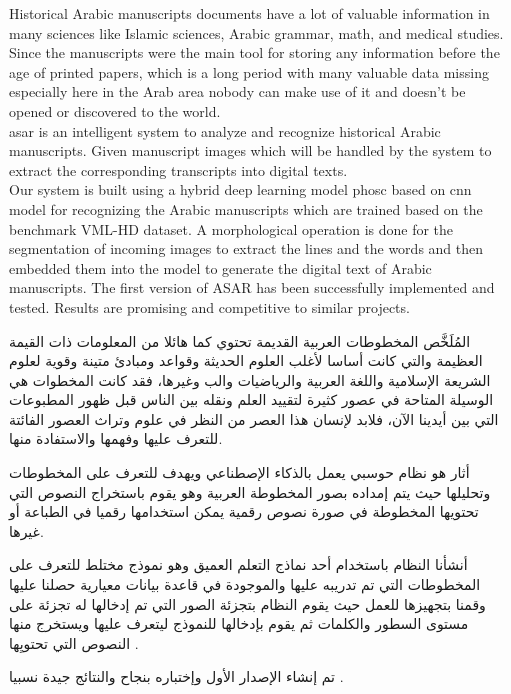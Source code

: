 Historical Arabic manuscripts documents have a lot of valuable information in many sciences like Islamic sciences, Arabic grammar, math, and medical studies. Since the manuscripts were the main tool for storing any information before the age of printed papers, which is a long period with many valuable data missing especially here in the Arab area nobody can make use of it and doesn't be opened or discovered to the world. \\


\noindent
\acrfull{asar} is an intelligent system to analyze and recognize historical Arabic manuscripts. Given manuscript images which will be handled by the system to extract the corresponding transcripts into digital texts. \\ 

\noindent
Our system is built using a hybrid deep learning model \acrfull{phosc} based on \acrfull{cnn} model for recognizing the Arabic manuscripts which are trained based on the benchmark VML-HD dataset. A morphological operation is done for the segmentation of incoming images to extract the lines and the words and then embedded them into the model to generate the digital text of Arabic manuscripts. The first version of ASAR has been successfully implemented and tested. Results are promising and competitive to similar projects.

\newpage

\begin{arabtext}
{\huge
المُلَخَّص
}\vspace{20pt}
المخطوطات العربية القديمة تحتوي كما هائلا من المعلومات ذات القيمة العظيمة والتي كانت أساسا لأغلب العلوم الحديثة وقواعد ومبادئ متينة وقوية لعلوم الشريعة الإسلامية واللغة العربية والرياضيات والب وغيرها، فقد كانت المخطوات هي الوسيلة المتاحة في عصور كثيرة لتقييد العلم ونقله بين الناس قبل ظهور المطبوعات التي بين أيدينا الآن، فلابد لإنسان هذا العصر من النظر في علوم وتراث العصور الفائتة للتعرف عليها وفهمها والاستفادة منها.

\vspace{\baselineskip}

أثار هو نظام حوسبي يعمل بالذكاء الإصطناعي ويهدف للتعرف على المخطوطات وتحليلها حيث يتم إمداده بصور المخطوطة العربية وهو يقوم باستخراج النصوص التي تحتويها المخطوطة في صورة نصوص رقمية يمكن استخدامها رقميا في الطباعة أو غيرها.

\vspace{\baselineskip}

أنشأنا النظام باستخدام أحد نماذج التعلم العميق وهو نموذج مختلط  للتعرف على المخطوطات التي تم تدريبه عليها والموجودة في قاعدة بيانات معيارية حصلنا عليها وقمنا بتجهيزها للعمل حيث يقوم النظام بتجزئة الصور التي تم إدخالها له تجزئة على مستوى السطور والكلمات ثم يقوم بإدخالها للنموذج ليتعرف عليها ويستخرج منها النصوص التي تحتويِها .

 تم إنشاء الإصدار الأول وإختباره بنجاح والنتائج جيدة نسبيا .
\end{arabtext}
\newpage


